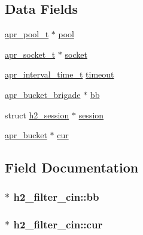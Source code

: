 \subsection*{Data Fields}
\begin{DoxyCompactItemize}
\item 
\hyperlink{structapr__pool__t}{apr\+\_\+pool\+\_\+t} $\ast$ \hyperlink{structh2__filter__cin_a63b8f38ac651f0c071952a044ddca0fc}{pool}
\item 
\hyperlink{structapr__socket__t}{apr\+\_\+socket\+\_\+t} $\ast$ \hyperlink{structh2__filter__cin_a96d37d6fd8c426538e6441eaa9b855b8}{socket}
\item 
\hyperlink{group__apr__time_gaae2129185a395cc393f76fabf4f43e47}{apr\+\_\+interval\+\_\+time\+\_\+t} \hyperlink{structh2__filter__cin_a26fc5ad8a7cb2286a085d9f8d464530c}{timeout}
\item 
\hyperlink{structapr__bucket__brigade}{apr\+\_\+bucket\+\_\+brigade} $\ast$ \hyperlink{structh2__filter__cin_a7b7a645866c26eaf5039bdb6565e394c}{bb}
\item 
struct \hyperlink{structh2__session}{h2\+\_\+session} $\ast$ \hyperlink{structh2__filter__cin_a2494031f9e3a6e0285892d2c6cebc387}{session}
\item 
\hyperlink{structapr__bucket}{apr\+\_\+bucket} $\ast$ \hyperlink{structh2__filter__cin_a05f47b7882f4da7acfb7aeb29665bf7d}{cur}
\end{DoxyCompactItemize}


\subsection{Field Documentation}
\subsubsection[{\texorpdfstring{bb}{bb}}]{$\ast$ h2\+\_\+filter\+\_\+cin\+::bb}\hypertarget{structh2__filter__cin_a7b7a645866c26eaf5039bdb6565e394c}{}\label{structh2__filter__cin_a7b7a645866c26eaf5039bdb6565e394c}
\subsubsection[{\texorpdfstring{cur}{cur}}]{$\ast$ h2\+\_\+filter\+\_\+cin\+::cur}\hypertarget{structh2__filter__cin_a05f47b7882f4da7acfb7aeb29665bf7d}{}\label{structh2__filter__cin_a05f47b7882f4da7acfb7aeb29665bf7d}
